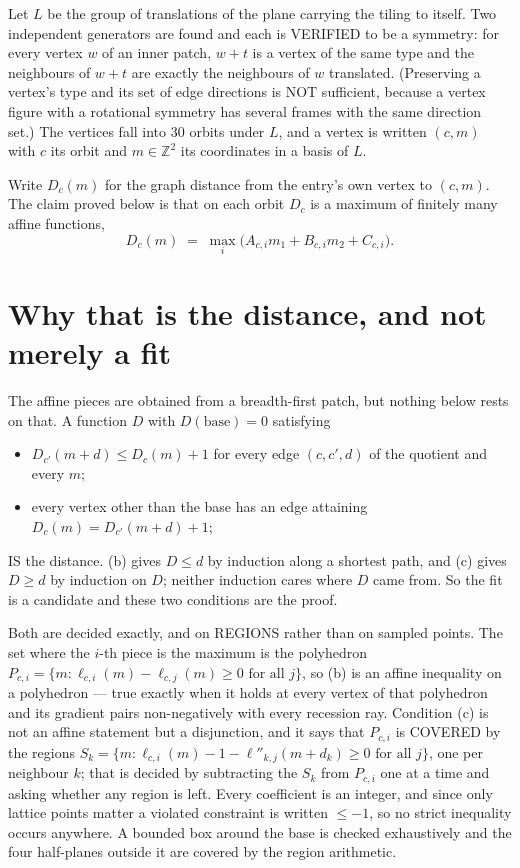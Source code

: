 \documentclass[11pt,a4paper]{article}
\theoremstyle{plain}
\theoremstyle{definition}
\begin{document}
Let $L$ be the group of translations of the plane carrying the tiling to itself. Two
independent generators are found and each is VERIFIED to be a symmetry: for every vertex $w$
of an inner patch, $w+t$ is a vertex of the same type and the neighbours of $w+t$ are exactly
the neighbours of $w$ translated. (Preserving a vertex's type and its set of edge directions
is NOT sufficient, because a vertex figure with a rotational symmetry has several frames with
the same direction set.) The vertices fall into $30$ orbits under $L$, and a vertex is
written $(c,m)$ with $c$ its orbit and $m\in\mathbb{Z}^2$ its coordinates in a basis of $L$.

Write $D_c(m)$ for the graph distance from the entry's own vertex to $(c,m)$. The claim proved
below is that on each orbit $D_c$ is a maximum of finitely many affine functions,
\[
D_c(m)\;=\;\max_i\bigl(A_{c,i}m_1+B_{c,i}m_2+C_{c,i}\bigr).
\]

\section{Why that is the distance, and not merely a fit}

The affine pieces are obtained from a breadth-first patch, but nothing below rests on that. A
function $D$ with $D(\text{base})=0$ satisfying

\begin{itemize}
\item[(b)] $D_{c'}(m+d)\le D_c(m)+1$ for every edge $(c,c',d)$ of the quotient and every $m$;
\item[(c)] every vertex other than the base has an edge attaining $D_c(m)=D_{c'}(m+d)+1$;
\end{itemize}

IS the distance. (b) gives $D\le d$ by induction along a shortest path, and (c) gives $D\ge d$
by induction on $D$; neither induction cares where $D$ came from. So the fit is a candidate and
these two conditions are the proof.

Both are decided exactly, and on REGIONS rather than on sampled points. The set where the
$i$-th piece is the maximum is the polyhedron
$P_{c,i}=\{m: \ell_{c,i}(m)-\ell_{c,j}(m)\ge0 \text{ for all } j\}$, so (b) is an
affine inequality on a polyhedron --- true exactly when it holds at every vertex of that
polyhedron and its gradient pairs non-negatively with every recession ray. Condition (c) is
not an affine statement but a disjunction, and it says that $P_{c,i}$ is COVERED by the
regions
$S_k=\{m:\ell_{c,i}(m)-1-\ell''_{k,j}(m+d_k)\ge0\text{ for all }j\}$, one per
neighbour $k$; that is decided by subtracting the $S_k$ from $P_{c,i}$ one at a time and
asking whether any region is left. Every coefficient is an integer, and since only lattice
points matter a violated constraint is written $\le-1$, so no strict inequality occurs
anywhere. A bounded box around the base is checked exhaustively and the four half-planes
outside it are covered by the region arithmetic.
\end{document}
